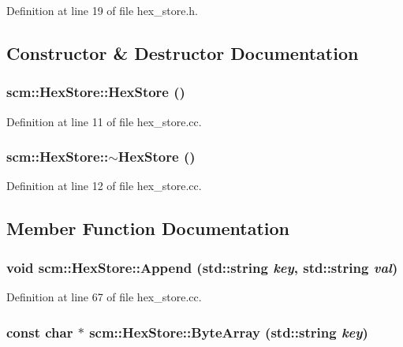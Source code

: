 Definition at line 19 of file hex\_\-store.h.



\subsection{Constructor \& Destructor Documentation}
\hypertarget{classscm_1_1_hex_store_ae3ea77bf45ef55916e02aba5f5d280f5}{
\subsubsection[{HexStore}]{\setlength{\rightskip}{0pt plus 5cm}scm::HexStore::HexStore ()}}
\label{classscm_1_1_hex_store_ae3ea77bf45ef55916e02aba5f5d280f5}


Definition at line 11 of file hex\_\-store.cc.

\hypertarget{classscm_1_1_hex_store_ac418965e7e9ee7569bb03b7230bad1bd}{
\subsubsection[{$\sim$HexStore}]{\setlength{\rightskip}{0pt plus 5cm}scm::HexStore::$\sim$HexStore ()}}
\label{classscm_1_1_hex_store_ac418965e7e9ee7569bb03b7230bad1bd}


Definition at line 12 of file hex\_\-store.cc.



\subsection{Member Function Documentation}
\hypertarget{classscm_1_1_hex_store_ac086449d331c2e0dd6eaf11a003ffe99}{
\subsubsection[{Append}]{\setlength{\rightskip}{0pt plus 5cm}void scm::HexStore::Append (std::string {\em key}, \/  std::string {\em val})}}
\label{classscm_1_1_hex_store_ac086449d331c2e0dd6eaf11a003ffe99}


Definition at line 67 of file hex\_\-store.cc.

\hypertarget{classscm_1_1_hex_store_a5e12c88428e17be9bb8f6c08ab107e57}{
\subsubsection[{ByteArray}]{\setlength{\rightskip}{0pt plus 5cm}const char $\ast$ scm::HexStore::ByteArray (std::string {\em key})}}
\label{classscm_1_1_hex_store_a5e12c88428e17be9bb8f6c08ab107e57}


